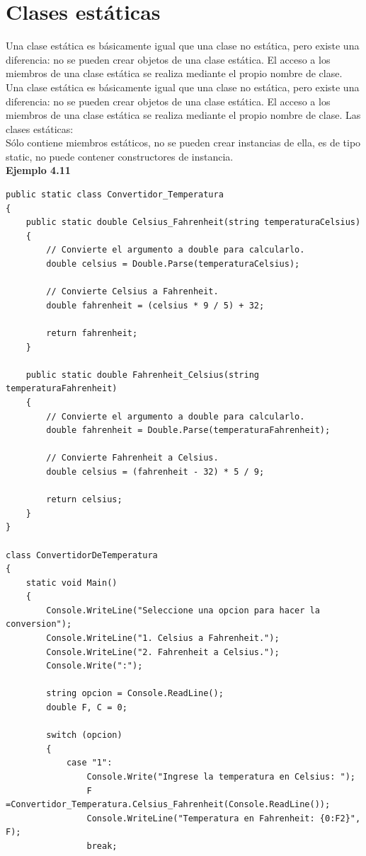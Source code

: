\documentclass[12pt,a4paper]{report}
\begin{document}
\section{Clases estáticas}
Una clase estática es básicamente igual que una clase no estática, pero existe una diferencia: no se pueden crear objetos de una clase estática. El acceso a los miembros de una clase estática se realiza mediante el propio nombre de clase.\\Una clase estática es básicamente igual que una clase no estática, pero existe una diferencia: no se pueden crear objetos de una clase estática. El acceso a los miembros de una clase estática se realiza mediante el propio nombre de clase. Las clases estáticas:\\Sólo contiene miembros estáticos, no se pueden crear instancias de ella, es de tipo static, no puede contener constructores de instancia.\\\textbf{Ejemplo 4.11} \begin{lstlisting}
public static class Convertidor_Temperatura
{
    public static double Celsius_Fahrenheit(string temperaturaCelsius)
    {
        // Convierte el argumento a double para calcularlo.
        double celsius = Double.Parse(temperaturaCelsius);

        // Convierte Celsius a Fahrenheit.
        double fahrenheit = (celsius * 9 / 5) + 32;

        return fahrenheit;
    }

    public static double Fahrenheit_Celsius(string temperaturaFahrenheit)
    {
        // Convierte el argumento a double para calcularlo.
        double fahrenheit = Double.Parse(temperaturaFahrenheit);

        // Convierte Fahrenheit a Celsius.
        double celsius = (fahrenheit - 32) * 5 / 9;

        return celsius;
    }
}

class ConvertidorDeTemperatura
{
    static void Main()
    {
        Console.WriteLine("Seleccione una opcion para hacer la conversion");
        Console.WriteLine("1. Celsius a Fahrenheit.");
        Console.WriteLine("2. Fahrenheit a Celsius.");
        Console.Write(":");

        string opcion = Console.ReadLine();
        double F, C = 0;

        switch (opcion)
        {
            case "1":
                Console.Write("Ingrese la temperatura en Celsius: ");
                F =Convertidor_Temperatura.Celsius_Fahrenheit(Console.ReadLine());
                Console.WriteLine("Temperatura en Fahrenheit: {0:F2}", F);
                break;


\end{lstlisting}
\end{document}
